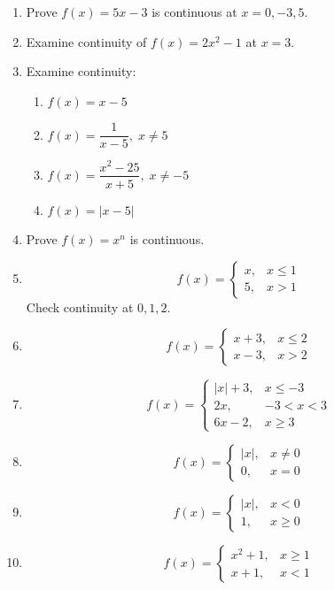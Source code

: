 \documentclass[12pt,a4paper]{article}
\begin{document}
\begin{enumerate}

\item Prove $f(x)=5x-3$ is continuous at $x=0,-3,5$.

\item Examine continuity of $f(x)=2x^2-1$ at $x=3$.

\item Examine continuity:
\begin{enumerate}
\item $f(x)=x-5$
\item $f(x)=\dfrac{1}{x-5},\; x\neq5$
\item $f(x)=\dfrac{x^2-25}{x+5},\; x\neq-5$
\item $f(x)=|x-5|$
\end{enumerate}

\item Prove $f(x)=x^n$ is continuous.

\item
\[
f(x)=
\begin{cases}
x,& x\le1\\
5,& x>1
\end{cases}
\]
Check continuity at $0,1,2$.

\item
\[
f(x)=
\begin{cases}
x+3,& x\le2\\
x-3,& x>2
\end{cases}
\]

\item
\[
f(x)=
\begin{cases}
|x|+3,& x\le-3\\
2x,& -3<x<3\\
6x-2,& x\ge3
\end{cases}
\]

\item
\[
f(x)=
\begin{cases}
|x|,& x\neq0\\
0,& x=0
\end{cases}
\]

\item
\[
f(x)=
\begin{cases}
|x|,& x<0\\
1,& x\ge0
\end{cases}
\]

\item
\[
f(x)=
\begin{cases}
x^2+1,& x\ge1\\
x+1,& x<1
\end{cases}
\]


\end{enumerate}
\end{document}
